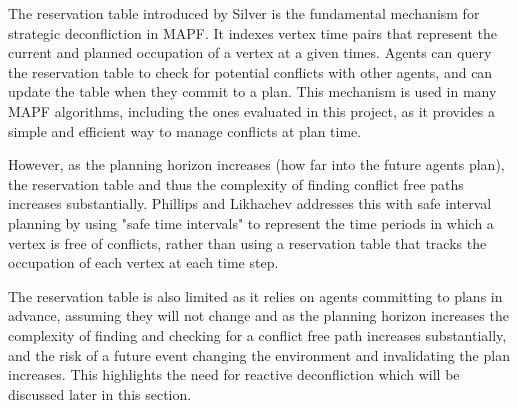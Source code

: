 \vspace{1em}

The reservation table introduced by Silver \cite{silver2005cooperative} is the fundamental mechanism for strategic deconfliction in MAPF. It indexes vertex time pairs that represent the current and planned occupation of a vertex at a given times. Agents can query the reservation table to check for potential conflicts with other agents, and can update the table when they commit to a plan. This mechanism is used in many MAPF algorithms, including the ones evaluated in this project, as it provides a simple and efficient way to manage conflicts at plan time. \par

\vspace{1em}

However, as the planning horizon increases (how far into the future agents plan), the reservation table and thus the complexity of finding conflict free paths increases substantially. Phillips and Likhachev \cite{phillips2011sipp} addresses this with safe interval planning by using "safe time intervals" to represent the time periods in which a vertex is free of conflicts, rather than using a reservation table that tracks the occupation of each vertex at each time step. \par

\vspace{1em}

The reservation table is also limited as it relies on agents committing to plans in advance, assuming they will not change and as the planning horizon increases the complexity of finding and checking for a conflict free path increases substantially, and the risk of a future event changing the environment and invalidating the plan increases. This highlights the need for reactive deconfliction which will be discussed later in this section. \par

\vspace{1em}


